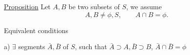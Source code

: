 \uline{Proposition} Let $A,B$ be two  subsets of $S$, we assume 
\[
 A,B\ne\phi,S,\qquad A\cap B=\phi.
\]

Equivalent conditions


a) $\exists$ segments $\bar A,\bar B$ of $S$, such that $\bar A\supset A,\bar B\supset B$, $\bar A\cap\bar B=\phi$
